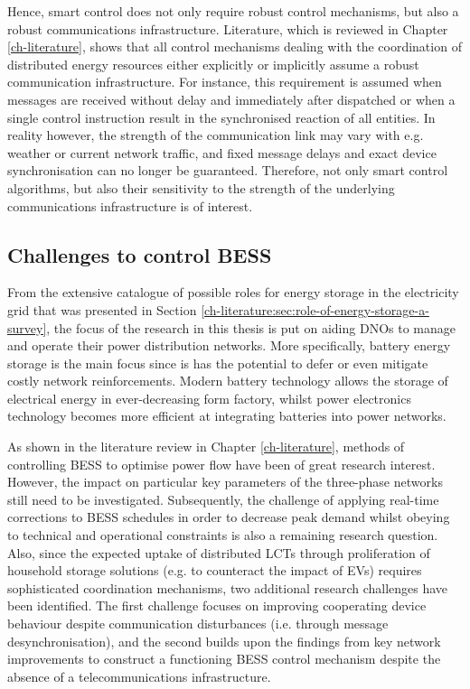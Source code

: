 Hence, smart control does not only require robust control mechanisms, but also a robust communications infrastructure.
Literature, which is reviewed in Chapter \ref{ch-literature}, shows that all control mechanisms dealing with the coordination of distributed energy resources either explicitly or implicitly assume a robust communication infrastructure.
For instance, this requirement is assumed when messages are received without delay and immediately after dispatched or when a single control instruction result in the synchronised reaction of all entities.
In reality however, the strength of the communication link may vary with e.g. weather or current network traffic, and fixed message delays and exact device synchronisation can no longer be guaranteed.
Therefore, not only smart control algorithms, but also their sensitivity to the strength of the underlying communications infrastructure is of interest.

\subsection{Challenges to control BESS}
\label{ch-introduction:subsec:motivation}

From the extensive catalogue of possible roles for energy storage in the electricity grid that was presented in Section \ref{ch-literature:sec:role-of-energy-storage-a-survey}, the focus of the research in this thesis is put on aiding DNOs to manage and operate their power distribution networks.
More specifically, battery energy storage is the main focus since is has the potential to defer or even mitigate costly network reinforcements.
Modern battery technology allows the storage of electrical energy in ever-decreasing form factory, whilst power electronics technology becomes more efficient at integrating batteries into power networks.

As shown in the literature review in Chapter \ref{ch-literature}, methods of controlling BESS to optimise power flow have been of great research interest.
However, the impact on particular key parameters of the three-phase networks still need to be investigated.
Subsequently, the challenge of applying real-time corrections to BESS schedules in order to decrease peak demand whilst obeying to technical and operational constraints is also a remaining research question.
Also, since the expected uptake of distributed LCTs through proliferation of household storage solutions (e.g. to counteract the impact of EVs) requires sophisticated coordination mechanisms, two additional research challenges have been identified.
The first challenge focuses on improving cooperating device behaviour despite communication disturbances (i.e. through message desynchronisation), and the second builds upon the findings from key network improvements to construct a functioning BESS control mechanism despite the absence of a telecommunications infrastructure.





